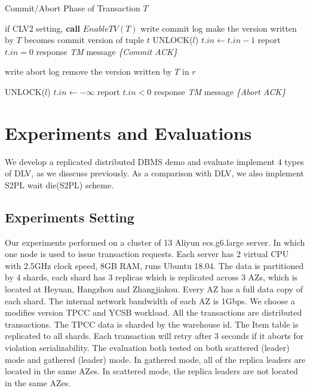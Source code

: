 \documentclass[conference]{IEEEtran}
\begin{document}
\begin{algorithm}[!h]
  \caption{Commit/Abort Phase of Transaction ${T}$}
  \begin{algorithmic}[1]
    \State if CLV2 setting, \textbf{call} ${EnableTV(T)}$ 
    \State write commit log
      \State make the version written by ${T}$ becomes commit version of tuple ${t}$ 
    \EndFor
      \State UNLOCK(${l}$)
    \EndFor
      \State ${t.in \gets t.in - 1}$ 
        \State report ${t.in = 0}$ 
      \EndIf
    \EndFor
    \State response \emph{TM} message \emph{\{Commit ACK\}}
    \label{func:commit}
  \EndFunction
  \end{algorithmic}
  \begin{algorithmic}[1]
  \State write abort log
    \State remove the version written by ${T}$ in ${r}$
\EndFor

      \State UNLOCK(${l}$)
    \EndFor
      \State ${t.in \gets -\infty }$
      \State report ${t.in < 0}$ 
    \EndFor
    \State response \emph{TM} message \emph{\{Abort ACK\}}
    \label{func:abort}
  \EndFunction
  \end{algorithmic}

  \label{alg:commit_phase}
\end{algorithm}

\section{Experiments and Evaluations}
\label{sec:experiments}
We develop a replicated distributed DBMS demo and evaluate implement 4 types of DLV, as we disscuss previously.
As a comparison with DLV, we also implement S2PL wait die(S2PL) scheme.


\subsection{Experiments Setting}
Our experiments performed on a cluster of 13 Aliyun ecs.g6.large server.
In which one node is used to issue transaction requests.
Each server has 2 virtual CPU with 2.5GHz clock speed, 8GB RAM, runs Ubuntu 18.04.
The data is partitioned by 4 shards, each shard has 3 replicas which is replicated across 3 AZs, which is located at Heyuan, Hangzhou and Zhangjiakou.
Every AZ has a full data copy of each shard.
The internal network bandwidth of each AZ is 1Gbps.
We choose a modifies version TPCC and YCSB workload.
All the transactions are distributed transactions.
The TPCC data is sharded by the warehouse id.
The Item table is replicated to all shards.
Each transaction will retry after 3 seconds if it aborts for violation serializability.
The evaluation both tested on both scattered (leader) mode and gathered (leader) mode.
In gathered mode, all of the replica leaders are located in the same AZes.
In scattered mode, the replica leaders are not located in the same AZes.
\end{document}
